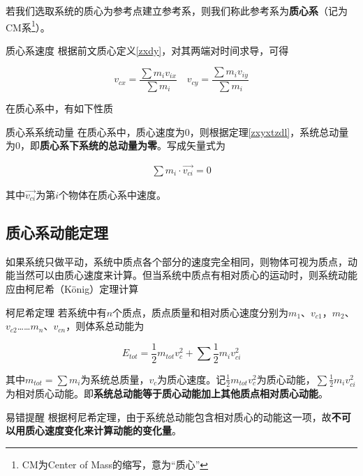 若我们选取系统的质心为参考点建立参考系，则我们称此参考系为\textbf{质心系}（记为CM系\footnote{CM为Center of Mass的缩写，意为“质心”}）。

\label{zxxsd}
\begin{theo}{质心系速度}{}
根据前文质心定义\eqref{zxdy}，对其两端对时间求导，可得

$$v_{cx} = \frac{\sum m_i v_{ix}}{\sum m_i} \quad v_{cy} = \frac{\sum m_i v_{iy}}{\sum m_i}$$
\end{theo}

在质心系中，有如下性质

\begin{theo}{质心系系统动量}{}
在质心系中，质心速度为$0$，则根据定理\eqref{zxyxtzdl}，系统总动量为$0$，即\textbf{质心系下系统的总动量为零}。写成矢量式为

\label{e_zxxdl}
\begin{subequations}
\begin{align*}
\sum m_i \cdot \vec{v_{ci}} = 0
\end{align*}
\end{subequations}

其中$\vec{v_{ci}}$为第$i$个物体在质心系中速度。
\end{theo}

\subsection{质心系动能定理}

如果系统只做平动，系统中质点各个部分的速度完全相同，则物体可视为质点，动能当然可以由质心速度来计算。但当系统中质点有相对质心的运动时，则系统动能应由柯尼希（König）定理计算

\begin{theo}{柯尼希定理}{}
若系统中有$n$个质点，质点质量和相对质心速度分别为$m_1$、$v_{c1}$，$m_2$、$v_{c2}$……$m_n$、$v_{cn}$，则体系总动能为

$$E_{tot}=\frac{1}{2} m_{tot} v_c^2 + \sum \frac{1}{2} m_i v_{ci}^2$$

其中$m_{tot} = \sum m_i$为系统总质量，$v_c$为质心速度。记$\frac{1}{2} m_{tot} v_c^2$为质心动能，$\sum \frac{1}{2} m_i v_{ci}^2$为相对质心动能。即\textbf{系统总动能等于质心动能加上其他质点相对质心动能}。
\end{theo}

\begin{mk}{易错提醒}{}
根据柯尼希定理，由于系统总动能包含相对质心的动能这一项，故\textbf{不可以用质心速度变化来计算动能的变化量}。
\end{mk}

